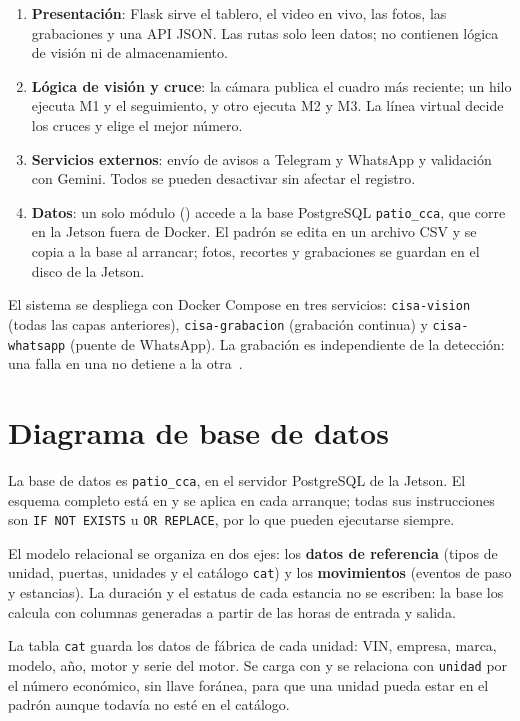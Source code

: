 \begin{enumerate}
  \item \textbf{Presentación}: Flask sirve el tablero, el video en vivo,
        las fotos, las grabaciones y una API JSON. Las rutas solo leen
        datos; no contienen lógica de visión ni de almacenamiento.
  \item \textbf{Lógica de visión y cruce}: la cámara publica el cuadro más
        reciente; un hilo ejecuta M1 y el seguimiento, y otro ejecuta M2 y
        M3. La línea virtual decide los cruces y elige el mejor número.
  \item \textbf{Servicios externos}: envío de avisos a Telegram y WhatsApp
        y validación con Gemini. Todos se pueden desactivar sin afectar el
        registro.
  \item \textbf{Datos}: un solo módulo () accede
        a la base PostgreSQL \texttt{patio\_cca}, que corre en la Jetson
        fuera de Docker. El padrón se edita en un archivo CSV y se copia a la
        base al arrancar; fotos, recortes y grabaciones se guardan en el disco
        de la Jetson.
\end{enumerate}

El sistema se despliega con Docker Compose en tres servicios:
\texttt{cisa-vision} (todas las capas anteriores), \texttt{cisa-grabacion}
(grabación continua) y \texttt{cisa-whatsapp} (puente de WhatsApp). La
grabación es independiente de la detección: una falla en una no detiene a
la otra~\cite{rep-tecnico}.

\section{Diagrama de base de datos}

La base de datos es \texttt{patio\_cca}, en el servidor PostgreSQL de la
Jetson. El esquema completo está en  y se aplica
en cada arranque; todas sus instrucciones son \texttt{IF NOT EXISTS} u
\texttt{OR REPLACE}, por lo que pueden ejecutarse siempre.

El modelo relacional se organiza en dos ejes: los \textbf{datos de
referencia} (tipos de unidad, puertas, unidades y el catálogo
\texttt{cat}) y los \textbf{movimientos} (eventos de paso y estancias). La
duración y el estatus de cada estancia no se escriben: la base los calcula
con columnas generadas a partir de las horas de entrada y salida.

La tabla \texttt{cat} guarda los datos de fábrica de cada unidad: VIN,
empresa, marca, modelo, año, motor y serie del motor. Se carga con
 y se relaciona con \texttt{unidad} por el
número económico, sin llave foránea, para que una unidad pueda estar en el
padrón aunque todavía no esté en el catálogo.

